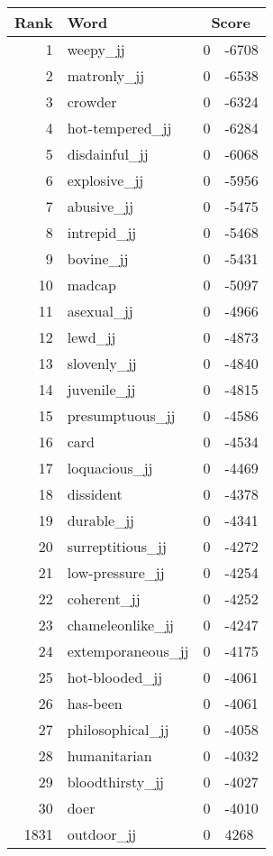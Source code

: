 \begin{longtable}[!htbp]{| rlr@{.}l |}
    \hline
    \textbf{Rank} & \textbf{Word} & \multicolumn{2}{c|}{\textbf{Score}} \\
    \hline
    \endhead
    1 & weepy\_jj & 0 & -6708 \\
    2 & matronly\_jj & 0 & -6538 \\
    3 & crowder & 0 & -6324 \\
    4 & hot-tempered\_jj & 0 & -6284 \\
    5 & disdainful\_jj & 0 & -6068 \\
    6 & explosive\_jj & 0 & -5956 \\
    7 & abusive\_jj & 0 & -5475 \\
    8 & intrepid\_jj & 0 & -5468 \\
    9 & bovine\_jj & 0 & -5431 \\
    10 & madcap & 0 & -5097 \\
    11 & asexual\_jj & 0 & -4966 \\
    12 & lewd\_jj & 0 & -4873 \\
    13 & slovenly\_jj & 0 & -4840 \\
    14 & juvenile\_jj & 0 & -4815 \\
    15 & presumptuous\_jj & 0 & -4586 \\
    16 & card & 0 & -4534 \\
    17 & loquacious\_jj & 0 & -4469 \\
    18 & dissident & 0 & -4378 \\
    19 & durable\_jj & 0 & -4341 \\
    20 & surreptitious\_jj & 0 & -4272 \\
    21 & low-pressure\_jj & 0 & -4254 \\
    22 & coherent\_jj & 0 & -4252 \\
    23 & chameleonlike\_jj & 0 & -4247 \\
    24 & extemporaneous\_jj & 0 & -4175 \\
    25 & hot-blooded\_jj & 0 & -4061 \\
    26 & has-been & 0 & -4061 \\
    27 & philosophical\_jj & 0 & -4058 \\
    28 & humanitarian & 0 & -4032 \\
    29 & bloodthirsty\_jj & 0 & -4027 \\
    30 & doer & 0 & -4010 \\
    1831 & outdoor\_jj & 0 & 4268 \\

\end{longtable}

